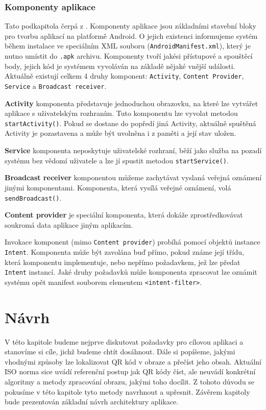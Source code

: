\subsection{Komponenty aplikace}

Tato podkapitola čerpá z \cite{applicationAndroidFundamentals}. Komponenty
aplikace jsou základními stavební bloky pro tvorbu aplikací na platformě Android. O jejich existenci informujeme systém během instalace ve
speciálním XML souboru (\texttt{AndroidManifest.xml}), který je nutno umístit do
\texttt{.apk} archivu. Komponenty tvoří jakési přístupové a spouštěcí body,
jejich kód je systémem vyvoláván na základě nějaké vnější události. Aktuálně
existují celkem 4 druhy komponent: \texttt{Activity}, \texttt{Content Provider},
\texttt{Service} a \texttt{Broadcast receiver}.

\bigskip \textbf{Activity} komponenta představuje jednoduchou
obrazovku, na které lze vytvářet aplikace s uživatelským rozhraním. Tuto
komponentu lze vyvolat metodou \texttt{startActivity()}. Pokud se dostane do
popředí jiná Activity, aktuálně spuštěná Activity je pozastavena a může být uvolněna i z paměti a její stav uložen.

\bigskip \textbf{Service} komponenta neposkytuje uživatelské rozhraní,
běží jako služba na pozadí systému bez vědomí uživatele a lze jí spustit metodou
\texttt{startService()}.

\bigskip \textbf{Broadcast receiver} komponentou můžeme zachytávat
vyslaná veřejná oznámení jinými komponentami. Komponenta, která vysílá veřejné
oznámení, volá \texttt{sendBroadcast()}.

\bigskip \textbf{Content provider} je speciální komponenta, která
dokáže zprostředkovávat soukromá data aplikace jiným aplikacím.

\bigskip Invokace komponent (mimo \texttt{Content provider}) probíhá pomocí
objektů instance \texttt{Intent}. Komponenta může být zavolána buď přímo, pokud známe
její třídu, která komponentu implementuje, nebo nepřímo požadavkem, jež lze 
předat \texttt{Intent} instancí. Jaké druhy požadavků může komponenta zpracovat
lze oznámit systému opět manifest souborem elementem \texttt{<intent-filter>}.


\chapter{Návrh}
\label{navrh}

V této kapitole budeme nejprve diskutovat požadavky pro cílovou aplikaci a
stanovíme si cíle, jichž budeme chtít dosáhnout. Dále si popíšeme, jakými 
vhodnými způsoby lze lokalizovat QR kód v obraze a přečíst jeho obsah. 
Aktuální ISO norma sice uvádí referenční postup jak QR kódy číst, ale neuvádí 
konkrétní algoritmy a metody zpracování obrazu, jakými toho docílit. Z tohoto
důvodu se pokusíme v této kapitole tyto metody navrhnout a upřesnit. Závěrem
kapitoly bude prezentován základní návrh architektury aplikace.

